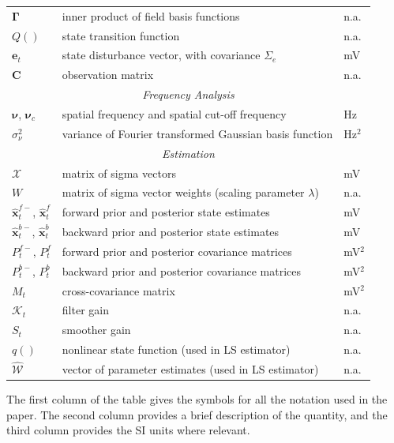 \documentclass[12pt]{iopart}
\begin{document}
\begin{table}[!ht]
\begin{tabular}{|l|l|l|}
   	$\boldsymbol{\Gamma}$ & inner product of field basis functions & n.a.\\
   	$Q()$ & state transition function & n.a.\\
   	$\mathbf{e}_t$ & state disturbance vector, with covariance $\Sigma_e$ & mV\\
   	$\mathbf{C}$ & observation matrix & n.a. \\
	\hline
	\multicolumn{3}{|c|}{\emph{Frequency Analysis}} \\
	\hline
	$\boldsymbol{\nu}$, $\boldsymbol{\nu}_c$ & spatial frequency and spatial cut-off frequency & Hz \\
	$\sigma_{\nu}^2$ & variance of Fourier transformed Gaussian basis function & Hz$^2$\\
	\hline
	\multicolumn{3}{|c|}{\emph{Estimation}} \\
	\hline
	$\mathcal{X}$ & matrix of sigma vectors & mV\\
	$W$ & matrix of sigma vector weights (scaling parameter $\lambda$) & n.a.\\
   	$\hat{\mathbf{x}}_t^{f-}$, $\hat{\mathbf{x}}_t^f$ & forward prior and posterior state estimates & mV\\
   	$\hat{\mathbf{x}}_t^{b-}$, $\hat{\mathbf{x}}_t^{b}$ & backward prior and posterior state estimates & mV\\
 	$P^{f-}_t$, $P^f_t$  & forward prior and posterior covariance matrices & mV$^2$\\
   	$P^{b-}_t$, $P^b_t$ & backward prior and posterior covariance matrices & mV$^2$\\
	$M_t$& cross-covariance matrix & mV$^2$\\
	$\mathcal K_{t} $ & filter gain & n.a.\\
	$S_t$ & smoother gain & n.a.\\
	$q()$ & nonlinear state function (used in LS estimator) & n.a.\\
   	$\mathcal{\hat{W}}$& vector of parameter estimates (used in LS estimator) & n.a.\\	
	\hline
\end{tabular}
\begin{flushleft}The first column of the table gives the symbols for all the notation used in the paper. The second column provides a brief description of the quantity, and the third column provides the SI units where relevant.
\end{flushleft}
\label{tab:Notation}
\end{table}
\end{document}
